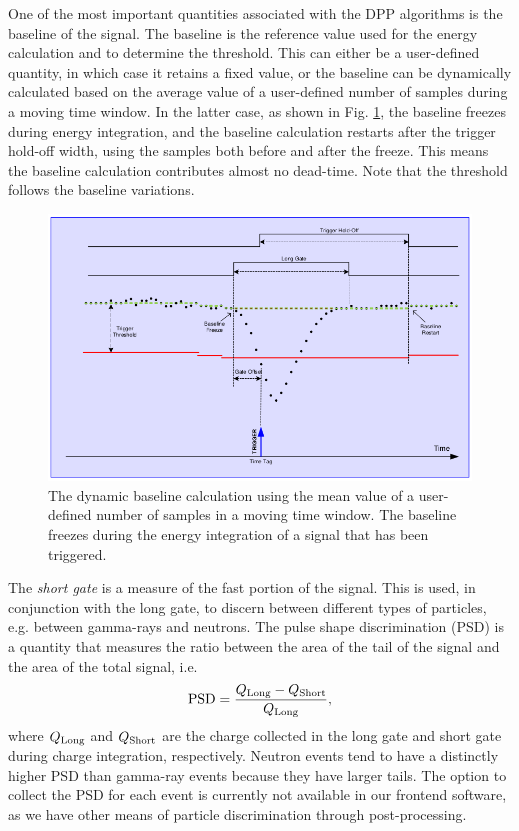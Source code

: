 One of the most important quantities associated with the DPP algorithms is the baseline of the signal. The baseline is the reference value used for the energy calculation and to determine the threshold. This can either be a user-defined quantity, in which case it retains a fixed value, or the baseline can be dynamically calculated based on the average value of a user-defined number of samples during a moving time window. In the latter case, as shown in Fig. \ref{fig:baseline_calc}, the baseline freezes during energy integration, and the baseline calculation restarts after the trigger hold-off width, using the samples both before and after the freeze. This means the baseline calculation contributes almost no dead-time. Note that the threshold follows the baseline variations.

\begin{figure}[t]
\centering
\includegraphics[width=6.5in]{Chapter-5/figs/baseline.png}
\caption{\label{fig:baseline_calc}The dynamic baseline calculation using the mean value of a user-defined number of samples in a moving time window. The baseline freezes during the energy integration of a signal that has been triggered.}
\end{figure}

The \emph{short gate} is a measure of the fast portion of the signal. This is used, in conjunction with the long gate, to discern between different types of particles, e.g. between gamma-rays and neutrons. The pulse shape discrimination (PSD) is a quantity that measures the ratio between the area of the tail of the signal and the area of the total signal, i.e.
\begin{equation*}
\textnormal{PSD} = \frac{Q_{\textnormal{Long}} - Q_{\textnormal{Short}}}{Q_{\textnormal{Long}}},
\end{equation*}
where $Q_{\textnormal{Long}}$ and $Q_{\textnormal{Short}}$ are the charge collected in the long gate and short gate during charge integration, respectively. Neutron events tend to have a distinctly higher PSD than gamma-ray events because they have larger tails. The option to collect the PSD for each event is currently not available in our frontend software, as we have other means of particle discrimination through post-processing.


